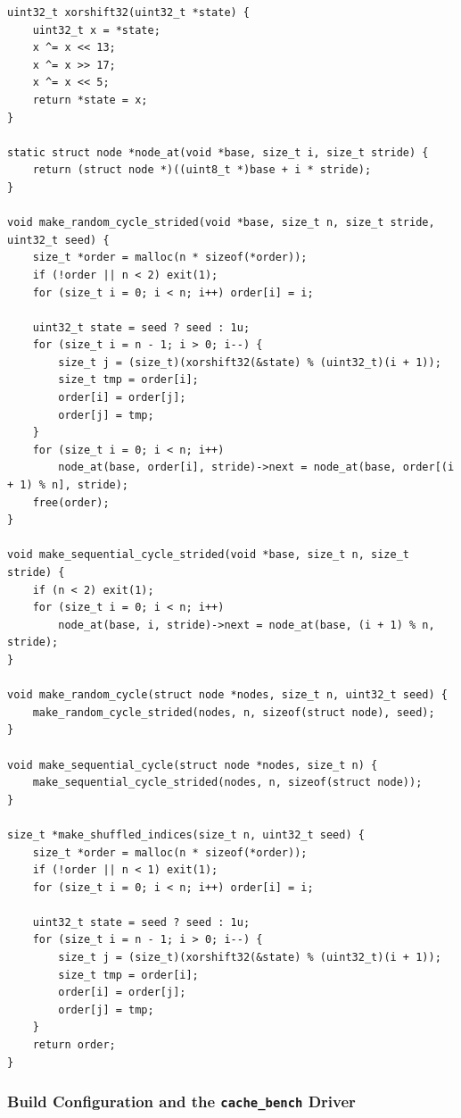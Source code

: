 \documentclass{article}
\begin{document}
\begin{lstlisting}[caption={PRNG, shuffle, and cycle construction (portable). File: \texttt{main\_code/common/random.h} / \texttt{random.c}, commit \texttt{e343732}.},label={lst:random}]
uint32_t xorshift32(uint32_t *state) {
    uint32_t x = *state;
    x ^= x << 13;
    x ^= x >> 17;
    x ^= x << 5;
    return *state = x;
}

static struct node *node_at(void *base, size_t i, size_t stride) {
    return (struct node *)((uint8_t *)base + i * stride);
}

void make_random_cycle_strided(void *base, size_t n, size_t stride, uint32_t seed) {
    size_t *order = malloc(n * sizeof(*order));
    if (!order || n < 2) exit(1);
    for (size_t i = 0; i < n; i++) order[i] = i;

    uint32_t state = seed ? seed : 1u;
    for (size_t i = n - 1; i > 0; i--) {
        size_t j = (size_t)(xorshift32(&state) % (uint32_t)(i + 1));
        size_t tmp = order[i];
        order[i] = order[j];
        order[j] = tmp;
    }
    for (size_t i = 0; i < n; i++)
        node_at(base, order[i], stride)->next = node_at(base, order[(i + 1) % n], stride);
    free(order);
}

void make_sequential_cycle_strided(void *base, size_t n, size_t stride) {
    if (n < 2) exit(1);
    for (size_t i = 0; i < n; i++)
        node_at(base, i, stride)->next = node_at(base, (i + 1) % n, stride);
}

void make_random_cycle(struct node *nodes, size_t n, uint32_t seed) {
    make_random_cycle_strided(nodes, n, sizeof(struct node), seed);
}

void make_sequential_cycle(struct node *nodes, size_t n) {
    make_sequential_cycle_strided(nodes, n, sizeof(struct node));
}

size_t *make_shuffled_indices(size_t n, uint32_t seed) {
    size_t *order = malloc(n * sizeof(*order));
    if (!order || n < 1) exit(1);
    for (size_t i = 0; i < n; i++) order[i] = i;

    uint32_t state = seed ? seed : 1u;
    for (size_t i = n - 1; i > 0; i--) {
        size_t j = (size_t)(xorshift32(&state) % (uint32_t)(i + 1));
        size_t tmp = order[i];
        order[i] = order[j];
        order[j] = tmp;
    }
    return order;
}
\end{lstlisting}

\subsubsection{Build Configuration and the \texttt{cache\_bench} Driver}
\label{sec:build}
\end{document}

